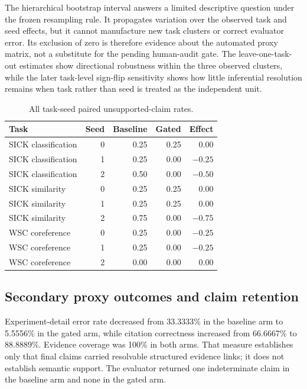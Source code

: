 \documentclass[11pt]{article}
\begin{document}
The hierarchical bootstrap interval answers a limited descriptive question under the frozen resampling rule. It propagates variation over the observed task and seed effects, but it cannot manufacture new task clusters or correct evaluator error. Its exclusion of zero is therefore evidence about the automated proxy matrix, not a substitute for the pending human-audit gate. The leave-one-task-out estimates show directional robustness within the three observed clusters, while the later task-level sign-flip sensitivity shows how little inferential resolution remains when task rather than seed is treated as the independent unit.

\begin{table}[H]
\centering
\caption{All task-seed paired unsupported-claim rates.}
\label{tab:pairs}
\small
\begin{tabular}{lrrrr}
\toprule
Task & Seed & Baseline & Gated & Effect \\
\midrule
SICK classification & 0 & 0.25 & 0.25 & 0.00 \\
SICK classification & 1 & 0.25 & 0.00 & $-0.25$ \\
SICK classification & 2 & 0.50 & 0.00 & $-0.50$ \\
SICK similarity & 0 & 0.25 & 0.25 & 0.00 \\
SICK similarity & 1 & 0.25 & 0.25 & 0.00 \\
SICK similarity & 2 & 0.75 & 0.00 & $-0.75$ \\
WSC coreference & 0 & 0.25 & 0.00 & $-0.25$ \\
WSC coreference & 1 & 0.25 & 0.00 & $-0.25$ \\
WSC coreference & 2 & 0.00 & 0.00 & 0.00 \\
\bottomrule
\end{tabular}
\end{table}

\subsection{Secondary proxy outcomes and claim retention}

Experiment-detail error rate decreased from 33.3333\% in the baseline arm to 5.5556\% in the gated arm, while citation correctness increased from 66.6667\% to 88.8889\%. Evidence coverage was 100\% in both arms. That measure establishes only that final claims carried resolvable structured evidence links; it does not establish semantic support. The evaluator returned one indeterminate claim in the baseline arm and none in the gated arm.
\end{document}
